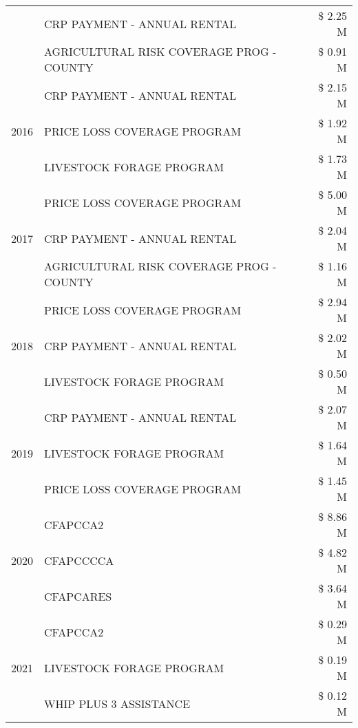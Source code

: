 \begin{tabular}{llr}
 & CRP PAYMENT - ANNUAL RENTAL & \$ 2.25 M \\
 & AGRICULTURAL RISK COVERAGE PROG - COUNTY & \$ 0.91 M \\
\cline{1-3}
\multirow[t]{3}{*}{2016} & CRP PAYMENT - ANNUAL RENTAL & \$ 2.15 M \\
 & PRICE LOSS COVERAGE PROGRAM & \$ 1.92 M \\
 & LIVESTOCK FORAGE PROGRAM & \$ 1.73 M \\
\cline{1-3}
\multirow[t]{3}{*}{2017} & PRICE LOSS COVERAGE PROGRAM & \$ 5.00 M \\
 & CRP PAYMENT - ANNUAL RENTAL & \$ 2.04 M \\
 & AGRICULTURAL RISK COVERAGE PROG - COUNTY & \$ 1.16 M \\
\cline{1-3}
\multirow[t]{3}{*}{2018} & PRICE LOSS COVERAGE PROGRAM & \$ 2.94 M \\
 & CRP PAYMENT - ANNUAL RENTAL & \$ 2.02 M \\
 & LIVESTOCK FORAGE PROGRAM & \$ 0.50 M \\
\cline{1-3}
\multirow[t]{3}{*}{2019} & CRP PAYMENT - ANNUAL RENTAL & \$ 2.07 M \\
 & LIVESTOCK FORAGE PROGRAM & \$ 1.64 M \\
 & PRICE LOSS COVERAGE PROGRAM & \$ 1.45 M \\
\cline{1-3}
\multirow[t]{3}{*}{2020} & CFAPCCA2 & \$ 8.86 M \\
 & CFAPCCCCA & \$ 4.82 M \\
 & CFAPCARES & \$ 3.64 M \\
\cline{1-3}
\multirow[t]{3}{*}{2021} & CFAPCCA2 & \$ 0.29 M \\
 & LIVESTOCK FORAGE PROGRAM & \$ 0.19 M \\
 & WHIP PLUS 3 ASSISTANCE & \$ 0.12 M \\
\cline{1-3}
\bottomrule
\end{tabular}
